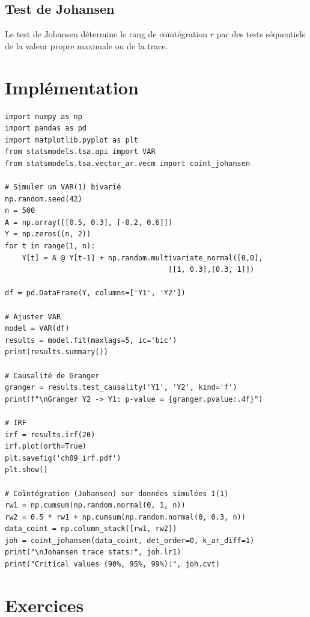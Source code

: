 \subsection{Test de Johansen}

\begin{definition}
Le test de Johansen d\'etermine le rang de co\"int\'egration $r$ par des tests s\'equentiels de la valeur propre maximale ou de la trace.
\end{definition}

\section{Impl\'ementation}

\begin{codeblock}[title=\textbf{Python}]
\begin{verbatim}
import numpy as np
import pandas as pd
import matplotlib.pyplot as plt
from statsmodels.tsa.api import VAR
from statsmodels.tsa.vector_ar.vecm import coint_johansen

# Simuler un VAR(1) bivarié
np.random.seed(42)
n = 500
A = np.array([[0.5, 0.3], [-0.2, 0.6]])
Y = np.zeros((n, 2))
for t in range(1, n):
    Y[t] = A @ Y[t-1] + np.random.multivariate_normal([0,0],
                                      [[1, 0.3],[0.3, 1]])

df = pd.DataFrame(Y, columns=['Y1', 'Y2'])

# Ajuster VAR
model = VAR(df)
results = model.fit(maxlags=5, ic='bic')
print(results.summary())

# Causalité de Granger
granger = results.test_causality('Y1', 'Y2', kind='f')
print(f"\nGranger Y2 -> Y1: p-value = {granger.pvalue:.4f}")

# IRF
irf = results.irf(20)
irf.plot(orth=True)
plt.savefig('ch09_irf.pdf')
plt.show()

# Coïntégration (Johansen) sur données simulées I(1)
rw1 = np.cumsum(np.random.normal(0, 1, n))
rw2 = 0.5 * rw1 + np.cumsum(np.random.normal(0, 0.3, n))
data_coint = np.column_stack([rw1, rw2])
joh = coint_johansen(data_coint, det_order=0, k_ar_diff=1)
print("\nJohansen trace stats:", joh.lr1)
print("Critical values (90%, 95%, 99%):", joh.cvt)
\end{verbatim}
\end{codeblock}

\section{Exercices}

